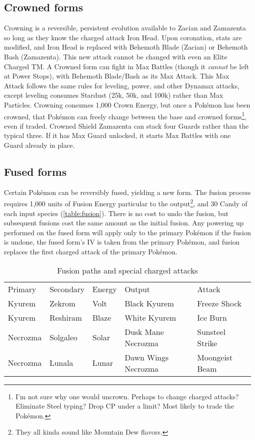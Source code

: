 \subsection{Crowned forms\label{sec:crowned}}
Crowning is a reversible, persistent evolution available to Zacian and Zamazenta
 so long as they know the charged attack Iron Head.
Upon coronation, stats are modified, and Iron Head is replaced with Behemoth Blade (Zacian)
  or Behemoth Bash (Zamazenta).
This new attack cannot be changed with even an Elite Charged TM\@.
A Crowned form can fight in Max Battles (though it \textit{cannot} be left at Power Stops), with Behemoth Blade/Bash as its Max Attack.
This Max Attack follows the same rules for leveling, power, and other Dynamax attacks,
 except leveling consumes Stardust (25k, 50k, and 100k) rather than Max Particles.
Crowning consumes 1,000 Crown Energy, but once a Pokémon has been crowned,
  that Pokémon can freely change between the base and crowned
  forms\footnote{I'm not sure why one would uncrown. Perhaps to change charged attacks?
    Eliminate Steel typing? Drop CP under a limit? Most likely to trade the Pokémon.}, even if traded.
Crowned Shield Zamazenta can stack four Guards rather than the typical three.
If it has Max Guard unlocked, it starts Max Battles with one Guard already in place.

\subsection{Fused forms\label{sec:fusion}}
Certain Pokémon can be reversibly fused, yielding a new form.
The fusion process requires 1,000 units of Fusion Energy particular to the output\footnote{They all kinda sound like Mountain Dew flavors.},
 and 30 Candy of each input species (\autoref{table:fusion}).
There is no cost to undo the fusion, but subsequent fusions cost the same amount as the initial fusion.
Any powering up performed on the fused form will apply only to the primary
  Pokémon if the fusion is undone, the fused form's IV is taken from the primary Pokémon,
  and fusion replaces the first charged attack of the primary Pokémon.

\begin{table}[ht]
\centering
\footnotesize
\begin{tabular}{lllll}
Primary & Secondary & Energy & Output & Attack\\
\Midrule
Kyurem & Zekrom & Volt & Black Kyurem & Freeze Shock\\
Kyurem & Reshiram & Blaze & White Kyurem & Ice Burn\\
Necrozma & Solgaleo & Solar & Dusk Mane Necrozma & Sunsteel Strike\\
Necrozma & Lunala & Lunar & Dawn Wings Necrozma & Moongeist Beam\\
\end{tabular}
\caption{Fusion paths and special charged attacks\label{table:fusion}}
\end{table}

